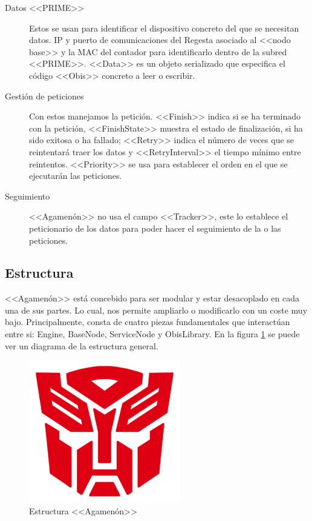 \begin{description}
	\item[Datos <<PRIME>>] Estos se usan para identificar el dispositivo concreto del que se necesitan datos. IP y puerto de comunicaciones del Regesta asociado al <<nodo base>> y la MAC del contador para identificarlo dentro de la subred <<PRIME>>. <<Data>> es un objeto serializado que especifica el código <<Obis>> concreto a leer o escribir.
	\item[Gestión de peticiones] Con estos manejamos la petición. <<Finish>> indica si se ha terminado con la petición, <<FinishState>> muestra el estado de finalización, si ha sido exitosa o ha fallado; <<Retry>> indica el número de veces que se reintentará traer los datos y <<RetryInterval>> el tiempo mínimo entre reintentos. <<Priority>> se usa para establecer el orden en el que se ejecutarán las peticiones.
	\item[Seguimiento] <<Agamenón>> no usa el campo <<Tracker>>, este lo establece el peticionario de los datos para poder hacer el seguimiento de la o las peticiones.
\end{description}


\subsection{Estructura}
<<Agamenón>> está concebido para ser modular y estar desacoplado en cada una de sus partes. Lo cual, nos permite ampliarlo o modificarlo con un coste muy bajo. Principalmente, consta de cuatro piezas fundamentales que interactúan entre si: Engine, BaseNode, ServiceNode y ObisLibrary. En la figura \ref{fig:EstructuraAgameon} se puede ver un diagrama de la estructura general.
\begin{figure}[htbp]
	\centering
	\includegraphics[width=\textwidth]{Img/dummy.png}
	\caption{Estructura <<Agamenón>>}
	\label{fig:EstructuraAgameon}
\end{figure}




